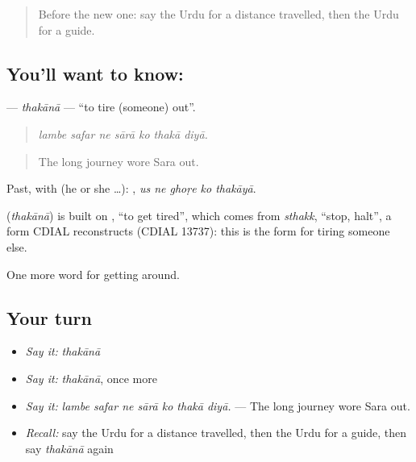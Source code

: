 \label{lesson:UR-C402-thakana}



\begin{quote}
Before the new one: say the Urdu for a distance travelled, then the Urdu for a guide.
\end{quote}

\subsection*{You'll want to know: }
\textbf{} — \emph{thakānā} — \textquotedblleft{}to tire (someone) out\textquotedblright{}.

\begin{quote}
      
\end{quote}

\begin{quote}
\emph{lambe safar ne sārā ko thakā diyā.}
\end{quote}

\begin{quote}
The long journey wore Sara out.
\end{quote}

Past, with  (he or she …):     , \emph{us ne ghoṛe ko thakāyā}.

\begin{cousinweb}
\textbf{} (\emph{thakānā}) is built on \textbf{}, \textquotedblleft{}to get tired\textquotedblright{}, which comes from \emph{sthakk}, \textquotedblleft{}stop, halt\textquotedblright{}, a form CDIAL reconstructs (CDIAL 13737): this is the form for tiring someone else.
\end{cousinweb}

\begin{grammarlens}[title={What you've built}]
One more word for getting around.
\end{grammarlens}

\subsection*{Your turn}
\begin{itemize}
\raggedright
  \item \emph{Say it:} \emph{thakānā}
  \item \emph{Say it:} \emph{thakānā}, once more
  \item \emph{Say it:} \emph{lambe safar ne sārā ko thakā diyā.} — The long journey wore Sara out.
  \item \emph{Recall:} say the Urdu for a distance travelled, then the Urdu for a guide, then say \emph{thakānā} again
\end{itemize}

